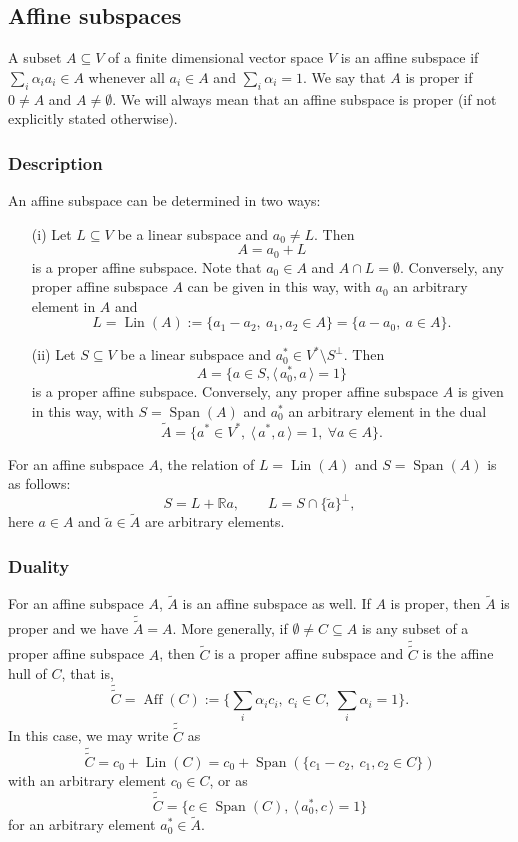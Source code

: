 \documentclass[12pt]{article}
\theoremstyle{definition}
\theoremstyle{remark}
\def\aff{\operatorname{Aff}}
\def\lin{\operatorname{Lin}}
\def\Span{\operatorname{Span}}
\def\<{\langle\,}
\def\>{\,\rangle}
\begin{document}
\subsection{Affine subspaces}

A subset $A\subseteq V$ of a finite dimensional vector space $V$ is an affine subspace if 
$\sum_i\alpha_i a_i\in A$ whenever all $a_i\in A$ and $\sum_i\alpha_i=1$. We say that $A$
is proper if $0\ne A$ and $A\ne \emptyset$. We will always
mean  that an affine subspace is proper (if not explicitly stated otherwise).

\subsubsection{Description}
An affine
subspace can be determined in two ways:
\begin{enumerate}
\item[(i)] Let $L\subseteq V$ be a linear subspace and $a_0\ne L$. Then 
\[
A=a_0+L
\]
is a proper affine subspace.  Note that $a_0\in A$ and $A\cap L=\emptyset$.
Conversely, any proper affine subspace $A$ can be given in this way, with $a_0$ an arbitrary element in $A$ and
\[
L=\lin(A):=\{a_1-a_2,\ a_1,a_2\in A\}=\{a-a_0,\ a\in A\}.
\]
\item[(ii)] Let $S\subseteq V$ be a linear subspace and $a_0^*\in V^*\setminus S^\perp$. Then
\[
A=\{a\in S, \<a_0^*,a\>=1\}
\]
is a proper affine subspace. Conversely, any proper affine subspace $A$ is given in this way, with
$S=\Span(A)$ and $a_0^*$ an arbitrary element in the dual 
\[
\tilde A=\{a^*\in V^*,\ \<a^*,a\>=1,\ \forall a\in A\}.
\]
\end{enumerate}

For an affine subspace $A$, the relation of $L=\lin(A)$ and $S=\Span(A)$ is as follows:
\[
S=L+\mathbb R a,\qquad L=S\cap \{\tilde a\}^\perp,
\]
here $a\in A$ and $\tilde a\in \tilde A$ are arbitrary elements.


\subsubsection{Duality}

For an affine subspace $A$,  $\tilde A$ is an affine subspace as well. If $A$ is proper,
then $\tilde A$ is proper and we have
$\tilde{\tilde A}=A$. More generally, if $\emptyset\ne C\subseteq A$ is any  subset of a
proper  affine
subspace $A$, then $\tilde C$ is a proper affine subspace 
and $\tilde{\tilde C}$ is the affine hull of $C$, that is,
\[
\tilde{\tilde C}=\aff(C):=\{\sum_i \alpha_i c_i,\ c_i\in C,\ \sum_i\alpha_i=1\}.
\]
In this case, we may write $\tilde{\tilde C}$ as
\[
\tilde{\tilde C}=c_0+\lin(C)=c_0+\Span(\{c_1-c_2,\ c_1,c_2\in C\})
\]
with an arbitrary element $c_0\in C$, or as
\[
\tilde{\tilde C}=\{c\in \Span(C),\ \<a_0^*,c\>=1\}
\]
for an arbitrary element $a_0^*\in \tilde A$.
\end{document}

